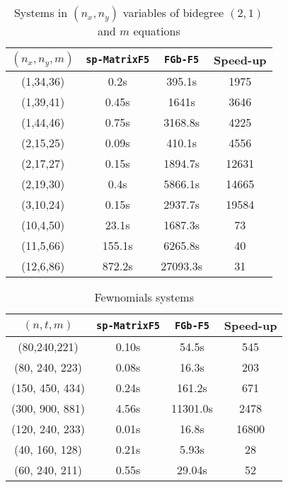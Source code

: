 \documentclass[12pt]{article}
\numberwithin{equation}{section}
\numberwithin{theorem}{section}
\begin{document}
\begin{table}
  \centering
  \begin{tabular}{|c||c|c|c|}
\hline
$(n_x,n_y,m)$ & {\tt sp-MatrixF5} & {\tt FGb-F5} &Speed-up \\
\hline
\hline
(1,34,36) & 0.2s & 395.1s & 1975 \\
(1,39,41) & 0.45s & 1641s & 3646 \\
(1,44,46) & 0.75s & 3168.8s & 4225 \\
(2,15,25) & 0.09s & 410.1s & 4556 \\
(2,17,27) & 0.15s & 1894.7s & 12631 \\
(2,19,30) & 0.4s & 5866.1s & 14665 \\
(3,10,24) & 0.15s & 2937.7s & 19584 \\
\hline
(10,4,50) & 23.1s & 1687.3s & 73 \\
(11,5,66) & 155.1s & 6265.8s & 40 \\
(12,6,86) & 872.2s & 27093.3s & 31 \\
\hline
 \end{tabular}
  \caption{Systems in $(n_x,n_y)$ variables of bidegree $(2,1)$ and $m$ equations}\label{table:bidegree}
\end{table}

\begin{table}
  \centering
  \begin{tabular}{|c||c|c||c|}
\hline
$(n,t,m)$ & {\tt sp-MatrixF5} & {\tt FGb-F5} &Speed-up \\
\hline
\hline
(80,240,221)&0.10s & 54.5s&545\\
(80,      240,     223)&           0.08s&               16.3s&203\\        
(150,     450,     434)&           0.24s&              161.2s&671\\
(300,     900,     881)&          4.56s&              11301.0s&2478\\
(120,     240,     233)&           0.01s&               16.8s&16800\\
(40,      160,     128)&            0.21s&               5.93s&28\\
(60,      240,     211)&            0.55s&              29.04s&52\\
\hline
  \end{tabular}
  \caption{Fewnomials systems}\label{table:fewnomials}
\end{table}
\end{document}
